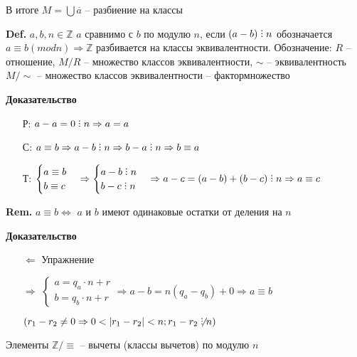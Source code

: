 \documentclass[14pt, letter paper]{article}
\DeclareRobustCommand{\divby}{%
  \mathrel{\text{\vbox{\baselineskip.65ex\lineskiplimit0pt\hbox{.}\hbox{.}\hbox{.}}}}%
}
\begin{document}
В итоге $M = \bigcup \overline{a}$ -- разбиение на классы

\textbf{Def.} $a, b, n \in \mathds{Z}$ $a$ сравнимо с $b$ по модулю $n$, если $(a-b) \divby n$ обозначается $a \equiv b (mod n) \Rightarrow \mathds{Z}$ разбивается на классы эквивалентности. Обозначение: $R$ -- отношение, $M/R$ -- множество классов эквивалентности, $\sim$ -- эквивалентность $M/\sim$ -- множество классов эквивалентности -- фактормножество

\begin{center}
    \textbf{Доказательство}
\end{center}

\begin{itemize}
    \item[Р:] $a - a = 0 \divby n \Rightarrow a = a$
    \item[С:] $a \equiv b \Rightarrow a - b \divby n \Rightarrow b - a \divby n \Rightarrow b \equiv a$
    \item[Т:] $\begin{cases}
        a \equiv b \\
        b \equiv c
    \end{cases} \Rightarrow \begin{cases}
        a - b \divby n \\
        b - c \divby n
    \end{cases} \Rightarrow a - c = (a - b) + (b - c) \divby n \Rightarrow a \equiv c$
\end{itemize}

\textbf{Rem.} $a \equiv b \Leftrightarrow$ $a$ и $b$ имеют одинаковые остатки от деления на $n$

\begin{center}
    \textbf{Доказательство}
\end{center}

\begin{itemize}
    \item[$\Leftarrow$] Упражнение
    \item[$\Rightarrow$] $\begin{cases}
        a = q_a \cdot n + r \\
        b = q_b \cdot n + r 
    \end{cases} \Rightarrow a - b = n(q_a - q_b) + 0 \Rightarrow a \equiv b$

    $(r_1 - r_2 \neq 0 \Rightarrow 0 < |r_1 - r_2| < n; r_1 - r_2 \not\divby n)$
\end{itemize}

Элементы $\mathds{Z}/\equiv$ -- вычеты (классы вычетов) по модулю $n$
\end{document}
